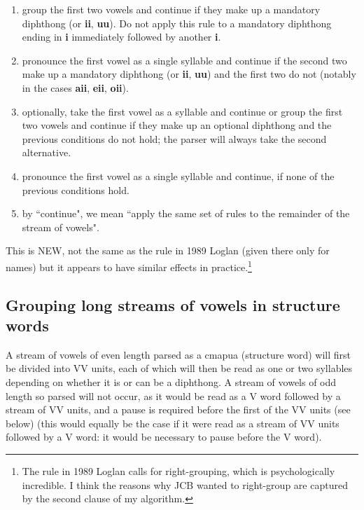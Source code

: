 \documentclass[12pt]{book}
\begin{document}
\begin{enumerate}

\item group the first two vowels and continue if they make up a mandatory diphthong (or {\bf ii}, {\bf uu}).  Do not apply this rule to a mandatory diphthong ending in {\bf i} immediately followed by another {\bf i}.

\item pronounce the first vowel as a single syllable and continue if the second two make up a mandatory diphthong (or {\bf ii}, {\bf uu})  and the first two do not (notably in the cases {\bf aii}, {\bf eii}, {\bf oii}).

\item optionally, take the first vowel as a syllable and continue or group the first two vowels and continue if they make up an optional diphthong and the previous conditions do
 not hold; the parser will always take the second alternative.

\item  pronounce the first vowel as a single syllable and continue, if none of the previous conditions hold.

\item  by ``continue", we mean ``apply the same set of rules to the remainder of the stream of vowels".

\end{enumerate}

This is NEW, not the same as the rule in 1989 Loglan (given there only for names) but it appears to have similar effects in practice.\footnote{The rule in 1989 Loglan calls for right-grouping, which is psychologically incredible.  I think the reasons why JCB wanted to right-group are captured by the second clause of my algorithm.}

\subsection{Grouping long streams of vowels in structure words}

A stream of vowels of even length parsed as a cmapua (structure word) will first be divided into VV units, each of which will then be read as one or two syllables depending on whether it is or can be a diphthong.  A stream of vowels of odd length so parsed will not occur, as it would be read as a V word followed by a stream of VV units, and a pause is required before the first of the VV units (see below) (this would equally be the case if it were read as a stream of VV units followed by a V word:  it would be necessary to pause before the V word).
\end{document}
